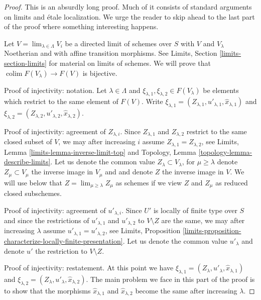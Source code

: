 \documentclass{stacks-project}
\theoremstyle{plain}
\theoremstyle{definition}
\theoremstyle{remark}
\numberwithin{equation}{subsection}
\def\lim{\mathop{\mathrm{lim}}\nolimits}
\def\colim{\mathop{\mathrm{colim}}\nolimits}
\begin{document}
\begin{proof}
This is an absurdly long proof. Much of it consists of standard
arguments on limits and \'etale localization. We urge the reader to skip ahead
to the last part of the proof where something interesting happens.

\medskip\noindent
Let $V = \lim_{\lambda \in \Lambda} V_i$ be a directed limit of schemes
over $S$ with $V$ and $V_\lambda$ Noetherian and with affine transition
morphisms. See Limits, Section \ref{limits-section-limits} for material on
limits of schemes. We will prove that $\colim F(V_\lambda) \to F(V)$
is bijective.

\medskip\noindent
Proof of injectivity: notation.
Let $\lambda \in \Lambda$ and
$\xi_{\lambda, 1}, \xi_{\lambda, 2} \in F(V_\lambda)$ 
be elements which restrict to the same element of $F(V)$.
Write $\xi_{\lambda, 1} = (Z_{\lambda, 1}, u'_{\lambda, 1},
\hat x_{\lambda, 1})$ and
$\xi_{\lambda, 2} = (Z_{\lambda, 2}, u'_{\lambda, 2}, \hat x_{\lambda, 2})$.

\medskip\noindent
Proof of injectivity: agreement of $Z_{\lambda, i}$.
Since $Z_{\lambda, 1}$ and $Z_{\lambda, 2}$ restrict to the same closed
subset of $V$, we may after increasing $i$ assume
$Z_{\lambda, 1} = Z_{\lambda, 2}$, see
Limits, Lemma \ref{limits-lemma-inverse-limit-top} and
Topology, Lemma \ref{topology-lemma-describe-limits}.
Let us denote the common value $Z_\lambda \subset V_\lambda$, for
$\mu \geq \lambda$
denote $Z_\mu \subset V_\mu$ the inverse image in $V_\mu$ and
and denote $Z$ the inverse image in $V$. We will use below that
$Z = \lim_{\mu \geq \lambda} Z_\mu$ as schemes if we view $Z$
and $Z_\mu$ as reduced closed subschemes.

\medskip\noindent
Proof of injectivity: agreement of $u'_{\lambda, i}$.
Since $U'$ is locally of finite type over $S$ and since
the restrictions of $u'_{\lambda, 1}$ and $u'_{\lambda, 2}$
to $V \setminus Z$ are the same, we may after increasing $\lambda$ assume
$u'_{\lambda, 1} = u'_{\lambda, 2}$, see Limits, Proposition
\ref{limits-proposition-characterize-locally-finite-presentation}.
Let us denote the common value $u'_\lambda$ and denote
$u'$ the restriction to $V \setminus Z$.

\medskip\noindent
Proof of injectivity: restatement.
At this point we have
$\xi_{\lambda, 1} = (Z_\lambda, u'_\lambda, \hat x_{\lambda, 1})$ and
$\xi_{\lambda, 2} = (Z_\lambda, u'_\lambda, \hat x_{\lambda, 2})$.
The main problem we face in this part of the proof
is to show that the morphisms
$\hat x_{\lambda, 1}$ and $\hat x_{\lambda, 2}$ become the same after
increasing $\lambda$.


\end{proof}
\end{document}
